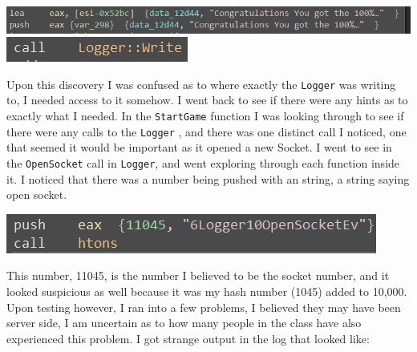 \documentclass{article}
\newcommand\tab[1][.5cm]{\hspace*{#1}}
\begin{document}
	\begin{center}
		\includegraphics[scale=.8]{StringIWant.png} \\
		\includegraphics[scale=1]{LoggerWrite.png}
	\end{center}

	\tab Upon this discovery I was confused as to where exactly the \texttt{Logger} was writing to, I needed
	access to it somehow. I went back to see if there were any hints as to exactly what I needed. In the 
	\texttt{StartGame} function I was looking through to see if there were any calls to the \texttt{Logger}
	, and there was one distinct call I noticed, one that seemed it would be important as it opened a new
	Socket. I went to see in the \texttt{OpenSocket} call in \texttt{Logger}, and went exploring through
	each function inside it. I noticed that there was a number being pushed with an string, a string saying
	open socket.
	\begin{center}
		\includegraphics[scale=1]{11045BINGO.png}
	\end{center}
	\tab This number, 11045, is the number I believed to be the socket number, and it looked suspicious as 
	well because it was my hash number (1045) added to 10,000. Upon testing however, I ran into a few
	problems, I believed they may have been server side, I am uncertain as to how many people in the class
	have also experienced this problem. I got strange output in the log that looked like:
\end{document}
